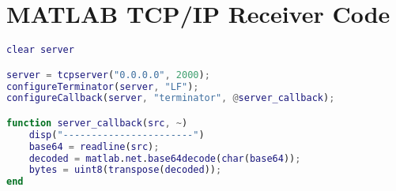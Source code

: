 \chapter{MATLAB TCP/IP Receiver Code}\label{appendix:matlab_receiver_code}

\begin{lstlisting}[language=MATLAB]
clear server

server = tcpserver("0.0.0.0", 2000);
configureTerminator(server, "LF");
configureCallback(server, "terminator", @server_callback);

function server_callback(src, ~)
    disp("-----------------------")
    base64 = readline(src);
    decoded = matlab.net.base64decode(char(base64));
    bytes = uint8(transpose(decoded));
end
\end{lstlisting}
